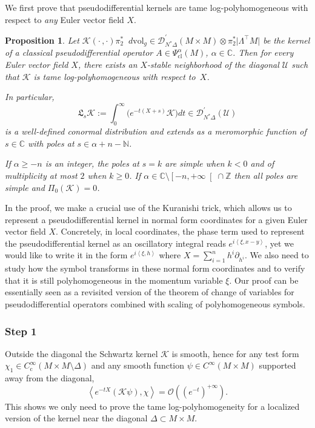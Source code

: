 \documentclass[JEP,XML,SOM,Unicode]{cedram}
\let\pazocal\mathscr
\newcommand{\LtM}{\Lambda^{\!\!\top\!}M}
\newtheorem{proposition}[theorem]{Proposition}
\theoremstyle{definition}
\renewcommand\c{\mathrm{c}}
\newcommand{\ph}{\mathrm{cl}}
\let\cv\alpha
\let\euler X
\newcommand{\clopen}[1]{\mathopen{}\mathclose{\left[#1 \right[}}
\newcommand{\step}[1]{\subsubsection*{Step #1}}
\newcommand\dvol{\mathop{}\!d\mathrm{vol}}
\begin{document}
We first prove that pseudodifferential kernels
are tame log-polyhomogeneous with respect to \emph{any} Euler vector field $\euler$.
\begin{proposition}\label{p:pseudopoly}
Let $\pazocal{K}(\cdot\,,\cdot)\pi_2^*\dvol_g\in \pazocal{D}^\prime_{N^*\Delta}(M\times M)\otimes \pi_2^*\vert \LtM \vert$ be the kernel of a classical pseudodifferential operator $A\in \Psi^\cv_{\ph}(M)$, {$\cv\in \mathbb{C}$}.
Then for every Euler vector field $\euler$, there exists an $\euler$-stable neighborhood of the diagonal $\pazocal{U}$ such that $\pazocal{K}$ is tame log-polyhomogeneous with respect to~$\euler$.

In particular,
\[
\mathfrak{L}_s\pazocal{K} {:= \int_0^\infty \bigl(e^{-t(\euler+s)}\pazocal{K}\bigr) dt \in \pazocal{D}^\prime_{N^*\Delta}(\pazocal{U})}
\]
is a well-defined conormal distribution and extends as a {meromorphic function} of $s\in \mathbb{C}$
with poles at $s\in \cv+n-\mathbb{N}$.

If $\cv\geqslant -n$ is an integer,
the poles at $s=k$ are simple when $k<0$ and of multiplicity at most $2$ when
$k\geqslant 0$. If $\cv\in \mathbb{C}\setminus \clopen{-n,+\infty}\cap \mathbb{Z} $ then all poles are simple and $\Pi_0(\pazocal{K})=0$.
\end{proposition}
In the proof, we make a crucial use of the Kuranishi trick, which allows us to represent a pseudodifferential kernel in normal form coordinates for a given Euler vector field $X$.
Concretely, in local coordinates, the phase term used to represent the pseudodifferential kernel as an oscillatory integral reads $e^{i\left\langle\xi,x-y \right\rangle}$, yet we would like to write it in the form $e^{i\left\langle\xi,h\right\rangle}$ where $X=\sum_{i=1}^nh^i\partial_{h^i}$. We also need to study how the symbol transforms in these normal form coordinates and to verify that it is still polyhomogeneous in the momentum variable $\xi$.
Our proof can be essentially seen as a revisited version of the theorem of change of variables for pseudodifferential operators combined with scaling of polyhomogeneous symbols.

\step{1} Outside the diagonal the
Schwartz kernel $\pazocal{K}$ is smooth, hence for any test form $\chi_1\in C^\infty_\c(M\times M\setminus \Delta)$ and any smooth function
$\psi\in C^\infty(M\times M)$ supported away from the diagonal,
\[
\left\langle e^{-t\euler} (\pazocal{K} \psi) ,\chi\right\rangle=\pazocal{O}((e^{-t})^{+\infty}).
\]
This shows we only need to prove the tame log-polyhomogeneity for a localized version of the kernel near the diagonal $\Delta\subset M\times M$.
\end{document}
